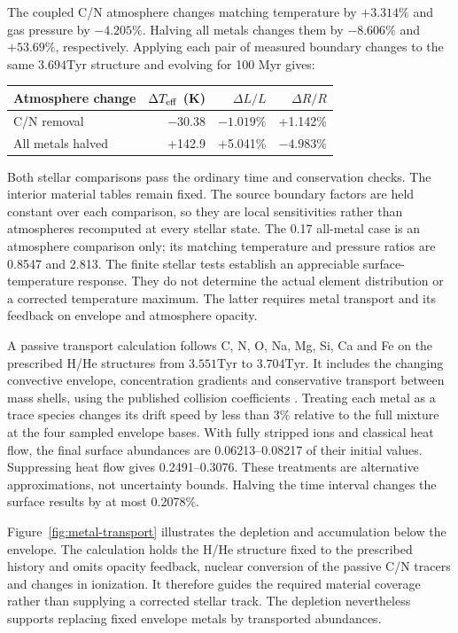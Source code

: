 \documentclass[11pt,letterpaper]{article}
\newcommand{\Tyr}{\mathrm{Tyr}}
\begin{document}
The coupled C/N atmosphere changes matching temperature by $+3.314\%$
and gas pressure by $-4.205\%$. Halving all metals changes them by
$-8.606\%$ and $+53.69\%$, respectively. Applying each pair of measured
boundary changes to the same $3.694\Tyr$ structure and evolving for
100 Myr gives:
\begin{center}\begin{tabular}{@{}lrrr@{}}\toprule
Atmosphere change & $\Delta T_{\rm eff}$ (K) & $\Delta L/L$ & $\Delta R/R$ \\\midrule
C/N removal & $-30.38$ & $-1.019\%$ & +1.142\% \\
All metals halved & +142.9 & +5.041\% & $-4.983\%$ \\\bottomrule
\end{tabular}\end{center}
Both stellar comparisons pass the ordinary time and conservation checks.
The interior material tables remain fixed. The source boundary factors are
held constant over each comparison, so they are local sensitivities rather
than atmospheres recomputed at every stellar state. The 0.17 all-metal case
is an atmosphere comparison only; its matching temperature and pressure
ratios are 0.8547 and 2.813. The finite stellar tests establish an appreciable
surface-temperature response. They do not determine the actual element
distribution or a corrected temperature maximum. The latter requires metal
transport and its feedback on envelope and atmosphere opacity.

A passive transport calculation follows C, N, O, Na, Mg, Si, Ca and Fe on
the prescribed H/He structures from $3.551\Tyr$ to $3.704\Tyr$. It includes
the changing convective envelope, concentration gradients and conservative
transport between mass shells, using the published collision coefficients
\cite{thoul94}. Treating each metal as a trace species changes its drift
speed by less than 3\% relative to the full mixture at the four sampled
envelope bases. With fully stripped ions and classical heat flow, the final
surface abundances are 0.06213--0.08217 of their initial values. Suppressing
heat flow gives 0.2491--0.3076. These treatments are alternative
approximations, not uncertainty bounds. Halving the time interval changes
the surface results by at most 0.2078\%.

Figure~\ref{fig:metal-transport} illustrates the depletion and accumulation
below the envelope. The calculation holds the H/He structure fixed to the
prescribed history and omits opacity feedback, nuclear conversion of the
passive C/N tracers and changes in ionization. It therefore guides the
required material coverage rather than supplying a corrected stellar track.
The depletion nevertheless supports replacing fixed envelope metals by
transported abundances.
\end{document}
